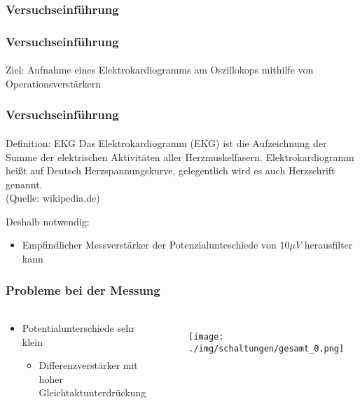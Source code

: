 \subsubsection{Versuchseinführung} %
\label{ssub:Versuchseinführung}
\begin{frame}
    \frametitle{Versuchseinführung}
    \framesubtitle{}
    \begin{block}{Ziel:}
        Aufnahme eines Elektrokardiogramms am Oszillokops mithilfe von
        Operationsverstärkern
    \end{block}
\end{frame}
\begin{frame}
    \frametitle{Versuchseinführung}
    \framesubtitle{}
    \begin{block}{Definition: EKG}
        Das Elektrokardiogramm (EKG) ist die Aufzeichnung der Summe der elektrischen
        Aktivitäten aller Herzmuskelfasern. Elektrokardiogramm heißt auf
        Deutsch Herzspannungskurve, gelegentlich wird es auch Herzschrift
        genannt.\\ (Quelle: wikipedia.de)
    \end{block}
    \begin{block}{Deshalb notwendig:}
        \begin{itemize}
            \item Empfindlicher Messverstärker der Potenzialunteschiede von
            $10 \mu V$ herausfilter kann
        \end{itemize}
    \end{block}     
\end{frame}

\begin{frame}
    \frametitle{Probleme bei der Messung}
    \framesubtitle{}
    \begin{columns}[c]
    \begin{block}{}
        \begin{itemize}
            \item Potentialunterschiede sehr klein
            \pause
            \begin{itemize}
                \item Differenzverstärker mit hoher
                Gleichtaktunterdrückung
            \end{itemize}
        \end{itemize}
    \end{block}
    \begin{figure}[H]
    \begin{center}
            \texttt{[image: ./img/schaltungen/gesamt\_0.png]}
    \end{center}
    \end{figure}
    \end{columns}
\end{frame}

